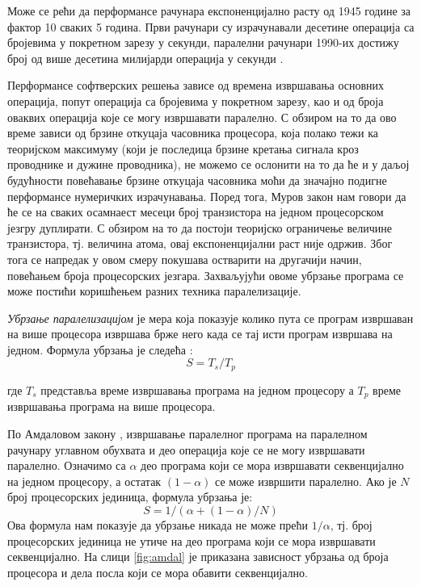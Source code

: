 \documentclass[12pt,oneside]{memoir}
\begin{document}
   Може се рећи да перформансе рачунара експоненцијално расту од 1945 године за фактор 10 сваких 5 година. Први рачунари су израчунавали десетине операција са бројевима у покретном зарезу у секунди, паралелни рачунари 1990-их достижу број од више десетина милијарди операција у секунди \cite{par_history}.
   
    Перформансе софтверских решења зависе од времена извршавања основних операција, попут операција са бројевима у покретном зарезу, као и од броја оваквих операција које се могу извршавати паралелно. С обзиром на то да ово време зависи од брзине откуцаја часовника процесора, која полако тежи ка теоријском максимуму (који је последица брзине кретања сигнала кроз проводнике и дужине проводника), не можемо се ослонити на то да ће и у даљој будућности повећавање брзине откуцаја часовника моћи да значајно подигне перформансе нумеричких израчунавања.
    Поред тога, Муров закон \cite{moore} нам говори да ће се на сваких осамнаест месеци број транзистора на једном процесорском језгру дуплирати. С обзиром на то да постоји теоријско ограничење величине транзистора, тј. величина атома, овај експоненцијални раст није одржив. Због тога се напредак у овом смеру покушава остварити на другачији начин, повећањем броја процесорских језгара. Захваљујући овоме убрзање програма  се може постићи коришћењем разних техника паралелизације.
    
     \textit{Убрзање паралелизацијом} је мера која показује колико пута се програм извршаван на више процесора извршава брже него када се тај исти програм извршава на једном. Формула убрзања је следећа \cite{par_various}:
 	$$ S = T_s/T_p $$
 	
\noindent где $ T_s $ представља време извршавања програма на једном процесору а $ T_p $ време извршавања програма на више процесора. 

 По Амдаловом закону \cite{par_various}, извршавање паралелног програма на паралелном рачунару углавном обухвата и део операција које се не могу извршавати паралелно. Означимо са $ \alpha $ део програма који се мора извршавати секвенцијално на једном процесору, а остатак $ (1 - \alpha)$ се може извршити паралелно. Ако је $ N $ број процесорских јединица, формула убрзања је: 
 	$$ S = 1 / ( \alpha + (1-\alpha)/N)$$
Ова формула нам показује да убрзање никада не може прећи $ 1/\alpha $, тј. број процесорских јединица не утиче на део програма који се мора извршавати секвенцијално. На слици \ref{fig:amdal} је приказана зависност убрзања од броја процесора и дела посла који се мора обавити секвенцијално.
\end{document}

